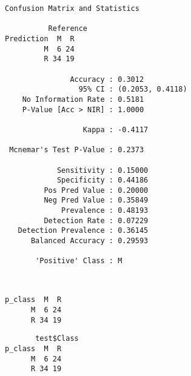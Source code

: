 \documentclass[
]{book}
\newenvironment{Shaded}{\begin{snugshade}}{\end{snugshade}}
\newcommand{\CommentTok}[1]{\textcolor[rgb]{0.56,0.35,0.01}{\textit{#1}}}
\newcommand{\KeywordTok}[1]{\textcolor[rgb]{0.13,0.29,0.53}{\textbf{#1}}}
\newcommand{\NormalTok}[1]{#1}
\newcommand{\OperatorTok}[1]{\textcolor[rgb]{0.81,0.36,0.00}{\textbf{#1}}}
\newcommand{\StringTok}[1]{\textcolor[rgb]{0.31,0.60,0.02}{#1}}
\begin{document}
\begin{verbatim}
Confusion Matrix and Statistics

          Reference
Prediction  M  R
         M  6 24
         R 34 19
                                          
               Accuracy : 0.3012          
                 95% CI : (0.2053, 0.4118)
    No Information Rate : 0.5181          
    P-Value [Acc > NIR] : 1.0000          
                                          
                  Kappa : -0.4117         
                                          
 Mcnemar's Test P-Value : 0.2373          
                                          
            Sensitivity : 0.15000         
            Specificity : 0.44186         
         Pos Pred Value : 0.20000         
         Neg Pred Value : 0.35849         
             Prevalence : 0.48193         
         Detection Rate : 0.07229         
   Detection Prevalence : 0.36145         
      Balanced Accuracy : 0.29593         
                                          
       'Positive' Class : M               
                                          
\end{verbatim}

\begin{Shaded}
\end{Shaded}

\begin{verbatim}
       
p_class  M  R
      M  6 24
      R 34 19
\end{verbatim}

\begin{Shaded}
\end{Shaded}

\begin{verbatim}
       test$Class
p_class  M  R
      M  6 24
      R 34 19
\end{verbatim}
\end{document}

